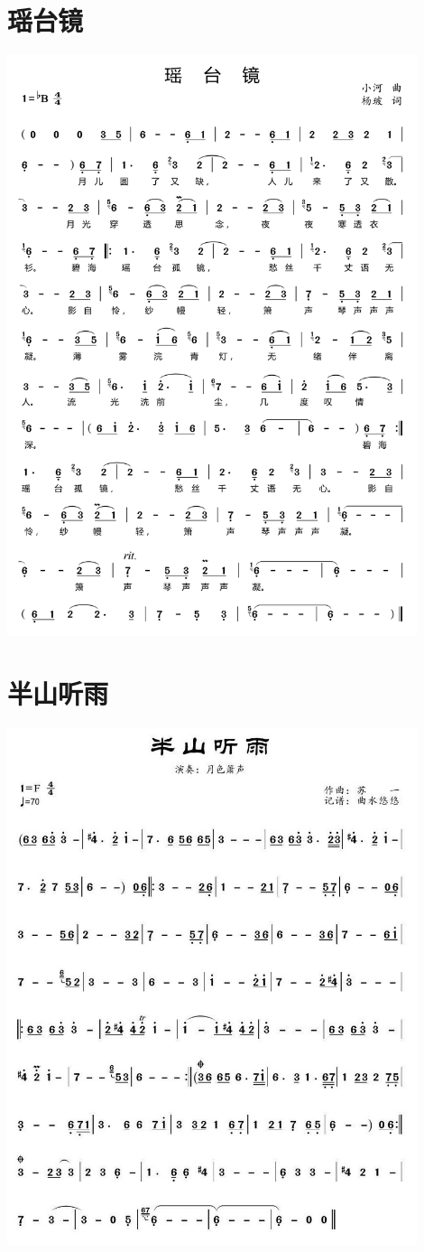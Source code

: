 \documentclass[cn,pad,twocol]{elegantbook}
\begin{document}
\section{瑶台镜}  \includegraphics[width=0.9\textwidth]{rpi400/20210127瑶台镜.jpg}
\section{半山听雨}  \includegraphics[width=0.9\textwidth]{rpi400/20210127半山听雨.jpg}
\end{document}
